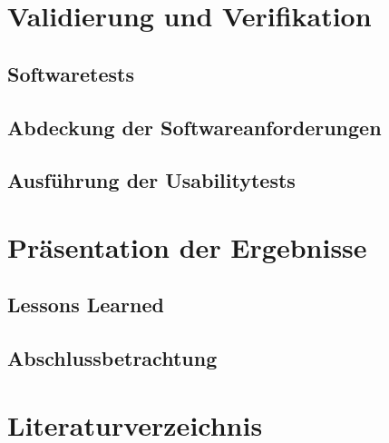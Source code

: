 \documentclass{scrreprt}
\begin{document}
\chapter{Validierung und Verifikation}

\section{Softwaretests}

\section{Abdeckung der Softwareanforderungen}

\section{Ausführung der Usabilitytests}


\chapter{Präsentation der Ergebnisse}

\section{Lessons Learned}

\section{Abschlussbetrachtung}


\chapter{Literaturverzeichnis}
\nocite{*}
\printbibliography
\end{document}

